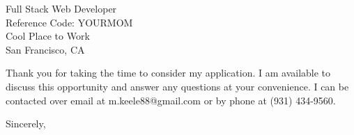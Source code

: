 \documentclass[11pt,letterpaper]{letter}
\begin{document}
\begin{letter}{
Full Stack Web Developer \\
Reference Code: YOURMOM\\
Cool Place to Work\\
San Francisco, CA
}

\noindent Thank you for taking the time to consider my application.
I am available to discuss this opportunity and answer any questions at your convenience.
I can be contacted over email at m.keele88@gmail.com or by phone at (931) 434-9560.

\closing{Sincerely,}

\vfill
\end{letter}
\end{document}
